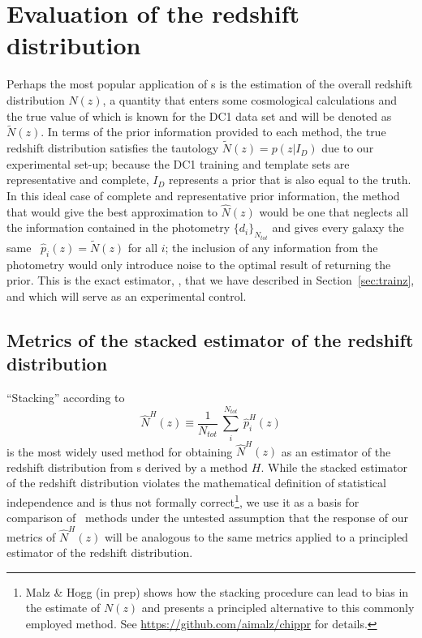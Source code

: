 \appendix

\section{Evaluation of the redshift distribution}
\label{sec:moments}

Perhaps the most popular application of \pzpdf s is the estimation of the overall redshift distribution $N(z)$, a quantity that enters some cosmological calculations and the true value of which is known for the DC1 data set and will be denoted as $\tilde{N}(z)$.
In terms of the prior information provided to each method, the true redshift distribution satisfies the tautology $\tilde{N}(z) = p(z \vert I_{D})$ due to our experimental set-up; because the DC1 training and template sets are representative and complete, $I_{D}$ represents a prior that is also equal to the truth.
In this ideal case of complete and representative prior information, the method that would give the best approximation to $\hat{N}(z)$ would be one that neglects all the information contained in the photometry $\{d_{i}\}_{N_{tot}}$ and gives every galaxy the same \pzpdf\ $\hat{p}_{i}(z) = \tilde{N}(z)$ for all $i$; the inclusion of any information from the photometry would only introduce noise to the optimal result of returning the prior.
This is the exact estimator, \trainz, that we have described in Section~\ref{sec:trainz}, and which will serve as an experimental control.

\subsection{Metrics of the stacked estimator of the redshift distribution}
\label{sec:stackedmetrics}

``Stacking'' according to
\begin{equation}
  \label{eq:stacked}
  \hat{N}^{H}(z) \equiv \frac{1}{N_{tot}}\ \sum_{i}^{N_{tot}}\ \hat{p}^{H}_{i}(z)
\end{equation}
 is the most widely used method for obtaining $\hat{N}^{H}(z)$ as an estimator of the redshift distribution from \pzpdf s derived by a method $H$. While the stacked estimator of the redshift distribution violates the mathematical definition of statistical independence and is thus not formally correct\footnote{Malz \& Hogg (in prep) shows how the stacking procedure can lead to bias in the estimate of $N(z)$ and presents a principled alternative to this commonly employed method.  See \url{https://github.com/aimalz/chippr} for details.}, we use it as a basis for comparison of \pzpdf\ methods under the untested assumption that the response of our metrics of $\hat{N}^{H}(z)$ will be analogous to the same metrics applied to a principled estimator of the redshift distribution.


